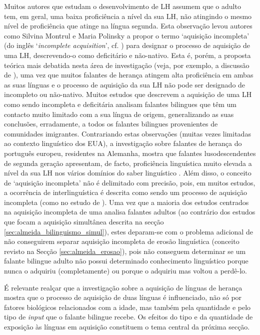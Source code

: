 \documentclass[output=paper]{LSP/langsci}
\begin{document}
Muitos autores que estudam o desenvolvimento de LH assumem que o  adulto tem, em geral, uma baixa proficiência a nível da sua LH, não atingindo o mesmo nível de proficiência que atinge na língua segunda. Esta observação levou autores como Silvina Montrul e Maria Polinsky a propor o termo `aquisição incompleta' (do inglês `\textit{incomplete acquisition}', cf. \citealt{montrul2008,polinsky2008}) para designar o processo de aquisição de uma LH, descrevendo-o como deficitário e não-nativo. Esta é, porém, a proposta teórica mais debatida nesta área de investigação (veja, por exemplo, a discussão de \citealt{kupischrothman2016}), uma vez que muitos falantes de herança atingem alta proficiência em ambas as suas línguas e o processo de aquisição da sua LH não pode ser designado de incompleto ou não-nativo. Muitos estudos que descrevem a aquisição de uma LH como sendo incompleta e deficitária analisam falantes bilingues que têm um contacto muito limitado com a sua língua de origem, generalizando as suas conclusões, erradamente, a todos os falantes bilingues provenientes de comunidades imigrantes. Contrariando estas observações (muitas vezes limitadas ao contexto linguístico dos EUA), a investigação sobre falantes de herança do português europeu, residentes na Alemanha, mostra que falantes lusodescendentes de segunda geração apresentam, de facto, proficiência linguística muito elevada a nível da sua LH nos vários domínios do saber linguístico \citep{barbosaflores2001,santosflores2013}. Além disso, o conceito de ‘aquisição incompleta’ não é delimitado com precisão, pois, em muitos estudos, a ocorrência de  interlinguística é descrita como sendo um processo de aquisição incompleta (como no estudo de \citealt{montrul2008}). Uma vez que a maioria dos estudos centrados na aquisição incompleta de uma  analisa falantes adultos (ao contrário dos estudos que focam a aquisição simultânea descrita na secção \ref{sec:almeida_bilinguismo_simul}), estes deparam-se com o problema adicional de não conseguirem separar aquisição incompleta de erosão linguística (conceito revisto na Secção \ref{sec:almeida_erosao}), pois não conseguem determinar se um falante bilingue adulto não possui determinado conhecimento linguístico porque nunca o adquiriu (completamente) ou porque o adquiriu mas voltou a perdê-lo. 

É relevante realçar que a investigação sobre a aquisição de línguas de herança mostra que o processo de aquisição de duas línguas é influenciado, não só por fatores biológicos relacionados com a idade, mas também pela quantidade e pelo tipo de \textit{input} que o falante bilingue recebe. Os efeitos do tipo e da quantidade de exposição às línguas em aquisição constituem o tema central da próxima secção.
\end{document}
